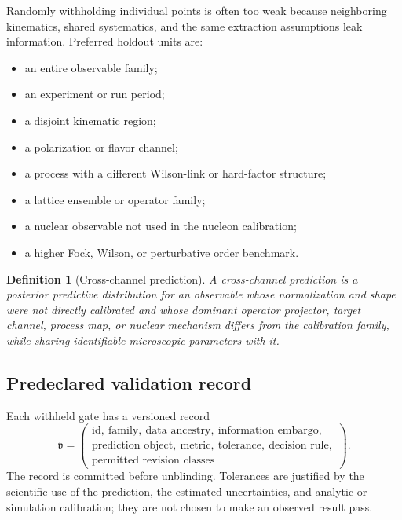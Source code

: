 \documentclass[11pt]{article}
\newtheorem{definition}{Definition}[section]
\begin{document}
Randomly withholding individual points is often too weak because neighboring
kinematics, shared systematics, and the same extraction assumptions leak
information.  Preferred holdout units are:
\begin{itemize}
\item an entire observable family;
\item an experiment or run period;
\item a disjoint kinematic region;
\item a polarization or flavor channel;
\item a process with a different Wilson-link or hard-factor structure;
\item a lattice ensemble or operator family;
\item a nuclear observable not used in the nucleon calibration;
\item a higher Fock, Wilson, or perturbative order benchmark.
\end{itemize}

\begin{definition}[Cross-channel prediction]
A cross-channel prediction is a posterior predictive distribution for an
observable whose normalization and shape were not directly calibrated and
whose dominant operator projector, target channel, process map, or nuclear
mechanism differs from the calibration family, while sharing identifiable
microscopic parameters with it.
\end{definition}

\subsection{Predeclared validation record}

Each withheld gate has a versioned record
\begin{equation}
 \mathfrak v
 =
 \left(
 \begin{gathered}
 \text{id},\ \text{family},\ \text{data ancestry},\
 \text{information embargo},\\
 \text{prediction object},\ \text{metric},\ \text{tolerance},\
 \text{decision rule},\\
 \text{permitted revision classes}
 \end{gathered}
 \right).
 \label{eq:validation-record}
\end{equation}
The record is committed before unblinding.  Tolerances are justified by the
scientific use of the prediction, the estimated uncertainties, and analytic or
simulation calibration; they are not chosen to make an observed result pass.
\end{document}
